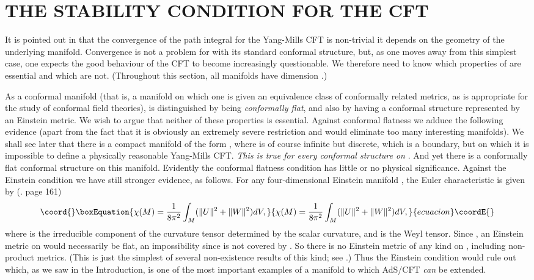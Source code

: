 \documentclass[a4paper,12pt]{article}
\providecommand{\field}[1]{\mathbb{#1}}
\providecommand{\R}{\field{R}}
\providecommand{\norm}[1]{\lVert#1\rVert}
\theoremstyle{definition}
\renewcommand{\u}{\textit}
\renewcommand{\-}{\myHighlight{$\dfrac{\quad\enspace}{\quad}$}\coordHE{}}
\begin{document}
\section{\large THE STABILITY CONDITION FOR THE CFT}

It is pointed out in \cite{3} that the convergence of the path integral for the Yang-Mills CFT is non-trivial \- it depends on the geometry of the underlying manifold. Convergence is not a problem for \coordHE{} with its standard conformal structure, but, as one moves away from this simplest case, one expects the good behaviour of the CFT to become increasingly questionable. We therefore need to know which properties of \coordHE{} are essential and which are not. (Throughout this section, all manifolds have dimension \coordHE{}.)

As a conformal manifold (that is, a manifold on which one is given an equivalence class of conformally related metrics, as is appropriate for the study of conformal field theories), \coordHE{} is distinguished by being \u{conformally flat}, and also by having a conformal structure represented by an Einstein metric. We wish to argue that neither of these properties is essential. Against conformal flatness we adduce the following evidence (apart from the fact that it is obviously an extremely severe restriction and would eliminate too many interesting manifolds). We shall see later that there is a compact manifold of the form \myHighlight{$\R^4/\Gamma$}\coordHE{}, where \myHighlight{$\Gamma$}\coordHE{} is of course infinite but discrete, which is a boundary, but on which it is impossible to define a physically reasonable Yang-Mills CFT. \u{This is true for every conformal structure on} \myHighlight{$\R^4/\Gamma$}\coordHE{}. And yet there is a conformally flat conformal structure on this manifold. Evidently the conformal flatness condition has little or no physical significance. Against the Einstein condition we have still stronger evidence, as follows. For any four-dimensional Einstein manifold \coordHE{}, the Euler characteristic is given by (\cite{8}. page 161)
\begin{equation}\coord{}\boxEquation{
\chi(M)=\dfrac{1}{8\pi^2}\int_M(\norm{U}^2+\norm{W}^2) dV,
}{
\chi(M)=\dfrac{1}{8\pi^2}\int_M(\norm{U}^2+\norm{W}^2) dV,
}{ecuacion}\coordE{}\end{equation} 
where \coordHE{} is the irreducible component of the curvature tensor determined by the scalar curvature, and \coordHE{} is the Weyl tensor. Since \coordHE{}, an Einstein metric on \coordHE{} would necessarily be flat, an impossibility since \coordHE{} is not covered by \myHighlight{$\R^4$}\coordHE{}. So there is no Einstein metric of any kind on \coordHE{}, including non-product metrics. (This is just the simplest of several non-existence results of this kind; see \cite{9}.) Thus the Einstein condition would rule out \coordHE{} \- which, as we saw in the Introduction, is one of the most important examples of a manifold to which AdS/CFT \u{can} be extended.
\end{document}
